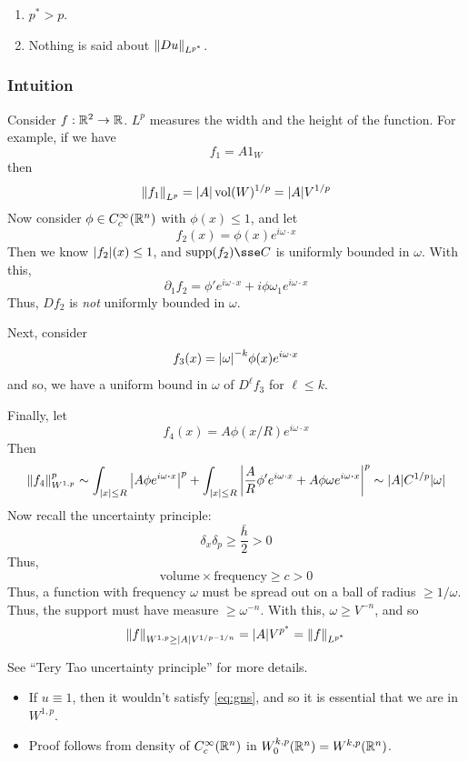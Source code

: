 \documentclass{article}
\begin{document}
\begin{remark}
    \begin{enumerate}
        \item \(p^* > p\).
        \item Nothing is said about \(\norm{Du}_{L^{p^*}}\).
    \end{enumerate}
\end{remark}

\subsubsection*{Intuition}

Consider \(f : \mathbb{R}^2 \to \mathbb{R}\). \(L^p\) measures the width and the height of the function. For example, if we have
\[f_1 = A 1_W\]
then
\[\norm{f_1}_{L^p} = \abs{A}\operatorname{vol}(W)^{1/p} = \abs{A}V^{1/p}\]
Now consider \(\phi \in C_c^\infty(\mathbb{R}^n)\) with \(\phi(x) \le 1\), and let
\[f_2(x) = \phi(x)e^{i\omega \cdot x}\]
Then we know \(\abs{f_2}(x) \le 1\), and \(\Supp(f_2) \sse C\) is uniformly bounded in \(\omega\). With this,
\[\partial_1f_2 =  \phi'e^{i\omega \cdot x} + i\phi \omega_1e^{i\omega\cdot x}\]
Thus, \(Df_2\) is \emph{not} uniformly bounded in \(\omega\).

Next, consider
\[f_3(x) = \abs{\omega}^{-k}\phi(x)e^{i \omega \cdot x}\]
and so, we have a uniform bound in \(\omega\) of \(D^\ell f_3\) for \(\ell \le k\).

Finally, let
\[f_4(x) = A\phi(x/R)e^{i\omega \cdot x}\]
Then
\[\norm{f_4}^p_{W^{1, p}} \sim \int_{\abs{x} \le R}\abs{A\phi e^{i\omega \vdot x}}^p + \int_{\abs{x} \le R}\abs{\frac{A}{R}\phi'e^{i\omega \cdot x} + A\phi \omega e^{i\omega\vdot x}}^p \sim \abs{A}C^{1/p}\abs{\omega}\]
Now recall the uncertainty principle:
\[\delta_x \delta_p \ge \frac{\bar h}{2} > 0\]
Thus,
\[\text{volume} \times \text{frequency} \ge c > 0\]
Thus, a function with frequency \(\omega\) must be spread out on a ball of radius \(\ge 1/\omega\). Thus, the support must have measure \(\ge \omega^{-n}\). With this, \(\omega \ge V^{-n}\), and so
\[\norm{f}_{W^{1, p} \ge \abs{A}V^{1/p - 1/n}} = \abs{A}V^{p^*} = \norm{f}_{L^{p^*}}\]

See ``Tery Tao uncertainty principle'' for more details.

\lec

\begin{remark}
    \begin{itemize}
        \item If \(u \equiv 1\), then it wouldn't satisfy \cref{eq:gns}, and so it is essential that we are in \(W^{1, p}\).
        \item Proof follows from density of \(C_c^\infty(\mathbb{R}^n)\) in \(W^{k, p}_0(\mathbb{R}^n) = W^{k,p}(\mathbb{R}^n)\).
    \end{itemize}
\end{remark}
\end{document}
